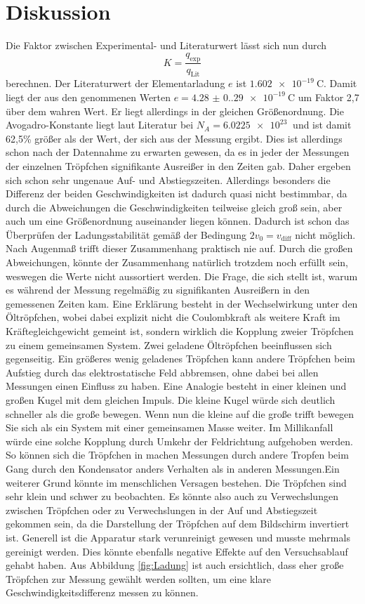 \section{Diskussion}
Die Faktor zwischen Experimental- und Literaturwert lässt sich nun durch 
\begin{equation}
    K =\frac{q_\text{exp}}{q_\text{Lit}}
\end{equation}
berechnen.
Der Literaturwert der Elementarladung $e$ ist $\qty{1.602e-19}{\coulomb}$\cite{PhysikTabellen}. Damit liegt der aus den genommenen Werten 
$e=\qty{4.28(0.29)e-19}{\coulomb}$ um Faktor 2,7 über dem wahren Wert. Er liegt allerdings in der gleichen Größenordnung.
Die Avogadro-Konstante liegt laut Literatur bei $N_A=\qty{6.0225e23}{}$\cite{PhysikTabellen} und ist damit 62,5\% größer als der Wert, der sich aus der Messung
ergibt. Dies ist allerdings schon nach der Datennahme zu erwarten gewesen, da es in jeder der Messungen der einzelnen Tröpfchen signifikante
Ausreißer in den Zeiten gab. Daher ergeben sich schon sehr ungenaue Auf- und Abstiegszeiten. Allerdings besonders die Differenz der beiden
Geschwindigkeiten ist dadurch quasi nicht bestimmbar, da durch die Abweichungen die Geschwindigkeiten teilweise gleich groß sein, aber auch um eine Größenordnung auseinander liegen können.
Dadurch ist schon das Überprüfen der Ladungsstabilität gemäß der Bedingung $2v_0=v_\text{diff}$ nicht möglich.
Nach Augenmaß trifft dieser Zusammenhang praktisch nie auf. Durch die großen Abweichungen, könnte der Zusammenhang natürlich trotzdem 
noch erfüllt sein, weswegen die Werte nicht aussortiert werden. Die Frage, die sich stellt ist, warum es während der Messung regelmäßig zu signifikanten
Ausreißern in den gemessenen Zeiten kam. Eine Erklärung besteht in der Wechselwirkung unter den Öltröpfchen, wobei dabei explizit nicht die Coulombkraft als weitere Kraft im
Kräftegleichgewicht gemeint ist, sondern wirklich die Kopplung zweier Tröpfchen zu einem gemeinsamen System. Zwei geladene Öltröpfchen
beeinflussen sich gegenseitig. Ein größeres wenig geladenes Tröpfchen kann andere Tröpfchen beim Aufstieg durch das elektrostatische Feld abbremsen,
ohne dabei bei allen Messungen einen Einfluss zu haben. Eine Analogie besteht in einer kleinen und großen Kugel mit dem gleichen Impuls. Die kleine Kugel würde sich deutlich schneller als die große bewegen.
Wenn nun die kleine auf die große trifft bewegen Sie sich als ein System mit einer gemeinsamen Masse weiter. Im Millikanfall würde eine solche Kopplung durch Umkehr der Feldrichtung aufgehoben werden. So 
können sich die Tröpfchen in machen Messungen durch andere Tropfen beim Gang durch den Kondensator anders Verhalten als in anderen Messungen.Ein weiterer Grund könnte im menschlichen Versagen bestehen. Die Tröpfchen sind sehr klein und schwer zu beobachten.
Es könnte also auch zu Verwechslungen zwischen Tröpfchen oder zu Verwechslungen in der Auf und Abstiegszeit gekommen sein, da die Darstellung der
Tröpfchen auf dem Bildschirm invertiert ist. Generell ist die Apparatur stark verunreinigt gewesen und musste mehrmals gereinigt werden. Dies könnte ebenfalls
negative Effekte auf den Versuchsablauf gehabt haben. Aus Abbildung \ref{fig:Ladung} ist auch ersichtlich, dass eher große Tröpfchen
zur Messung gewählt werden sollten, um eine klare Geschwindigkeitsdifferenz messen zu können.
\label{sec:Diskussion}
